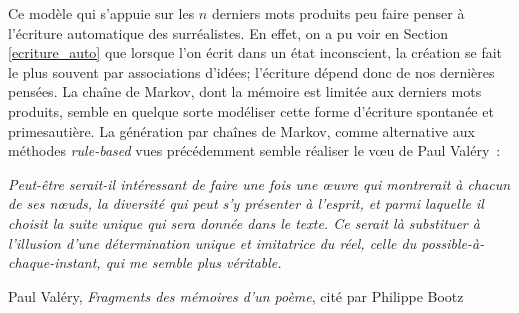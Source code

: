 \documentclass{article}
\newenvironment{citationbox}
{\begin{center}
		\begin{minipage}{.8\textwidth}
		}
		{
		\end{minipage}	
\end{center}
}
\begin{document}
				Ce modèle qui s'appuie sur les $n$ derniers mots produits peu faire penser à l'écriture automatique des surréalistes. En effet, on a pu voir en Section \ref{ecriture_auto} que lorsque l'on écrit dans un état inconscient, la création se fait le plus souvent par associations d'idées; l'écriture dépend donc de nos dernières pensées. La chaîne de Markov, dont la mémoire est limitée aux derniers mots produits, semble en quelque sorte modéliser cette forme d'écriture spontanée et primesautière. La génération par chaînes de Markov, comme alternative aux méthodes \textit{rule-based} vues précédemment semble réaliser le vœu de Paul Valéry~:
				\begin{citationbox}
					\textit{Peut-être serait-il intéressant de faire une fois une œuvre qui montrerait à chacun de ses nœuds, la diversité qui peut s’y présenter à l’esprit, et parmi laquelle il choisit la suite unique qui sera donnée dans le texte. Ce serait là substituer à l’illusion d’une détermination unique et imitatrice du réel, celle du possible-à-chaque-instant, qui me semble plus véritable.} 
					\begin{flushleft}
						Paul Valéry, \textit{Fragments des mémoires d'un poème}, cité par Philippe Bootz \autocite{bootz2012}
					\end{flushleft}
				\end{citationbox}
				
				
\end{document}
